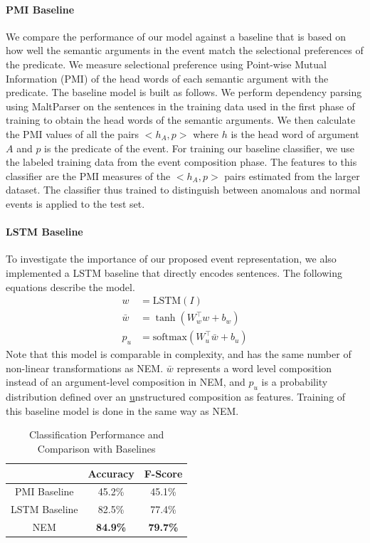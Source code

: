 \paragraph{PMI Baseline} We compare the performance of our model against a baseline that is based
on how well the semantic arguments in the event match the selectional preferences 
of the predicate.  We measure selectional preference using Point-wise Mutual Information
(PMI) \citep{church1990word} of the head words of each semantic argument with the predicate.  
The baseline model is built as follows.  We perform dependency parsing using MaltParser
\citep{nivre2007maltparser} on the sentences in the training data used in the first phase of training to
obtain the head words of the semantic arguments.  We then calculate the PMI values of all the pairs
$<h_A, p>$ where $h$ is the head word of argument $A$ and $p$ is the predicate of the event.  
For training our baseline classifier, we use the labeled training data from the event composition phase.
The features to this classifier are the PMI measures of the $<h_A, p>$ pairs estimated from the larger
dataset.  The classifier thus trained to distinguish between anomalous and normal events is applied to the test set.

\paragraph{LSTM Baseline} To investigate the importance of our proposed event representation, we also implemented a LSTM baseline that
directly encodes sentences. The following equations describe the model.
\begin{align}
 w &= \text{LSTM}(I) \\
 \bar{w} &= \tanh(W_w^\intercal w + b_w) \\
 p_u &= \text{softmax}(W_u^\intercal \bar{w} + b_u)
\end{align}
Note that this model is comparable in complexity, and has the same number of non-linear transformations as NEM. $\bar{w}$ represents a
word level composition instead of an argument-level composition in NEM, and $p_u$ is a probability distribution defined over an
\underline{u}nstructured composition as features. Training of this baseline model is done in the same way as NEM.

\begin{table}
\begin{center}
  \begin{tabular}[c]{|c|c|c|}
 \cline{2-3}
 \multicolumn{1}{c|}{}& \textbf{Accuracy} & \textbf{F-Score} \\
 \hline
 PMI Baseline& 45.2\% & 45.1\%\\
 LSTM Baseline & 82.5\% & 77.4\%\\
 \hline
 NEM & \textbf{84.9\%}& \textbf{79.7\%}\\
 \hline
  \end{tabular}
\end{center}
 \caption{Classification Performance and Comparison with Baselines}
 \label{table:nem_anomaly_results}
\end{table}

